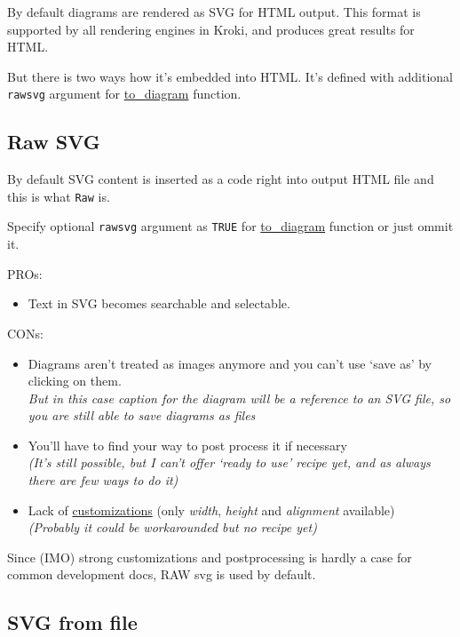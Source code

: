 \documentclass[
  12pt,
  a4paper,
  12pt,
  oneside,
  openany]{book}
\providecommand{\tightlist}{%
  \setlength{\itemsep}{0pt}\setlength{\parskip}{0pt}}
\begin{document}
By default diagrams are rendered as SVG for HTML output. This format is supported by all rendering engines in Kroki, and produces great results for HTML.

But there is two ways how it's embedded into HTML. It's defined with additional \texttt{rawsvg} argument for \protect\hyperlink{usage-spec}{to\_diagram} function.

\hypertarget{usage-svg-raw}{%
\subsection{Raw SVG}\label{usage-svg-raw}}

By default SVG content is inserted as a code right into output HTML file and this is what \texttt{Raw} is.

Specify optional \texttt{rawsvg} argument as \texttt{TRUE} for \protect\hyperlink{usage-spec}{to\_diagram} function or just ommit it.

PROs:

\begin{itemize}
\tightlist
\item
  Text in SVG becomes searchable and selectable.
\end{itemize}

CONs:

\begin{itemize}
\tightlist
\item
  Diagrams aren't treated as images anymore and you can't use `save as' by clicking on them.\\
  \emph{But in this case caption for the diagram will be a reference to an SVG file, so you are still able to save diagrams as files}
\item
  You'll have to find your way to post process it if necessary\\
  \emph{(It's still possible, but I can't offer `ready to use' recipe yet, and as always there are few ways to do it)}
\item
  Lack of \protect\hyperlink{usage-rChunks}{customizations} (only \emph{width}, \emph{height} and \emph{alignment} available)\\
  \emph{(Probably it could be workarounded but no recipe yet)}
\end{itemize}

Since (IMO) strong customizations and postprocessing is hardly a case for common development docs, RAW svg is used by default.

\hypertarget{usage-svg-file}{%
\subsection{SVG from file}\label{usage-svg-file}}
\end{document}
